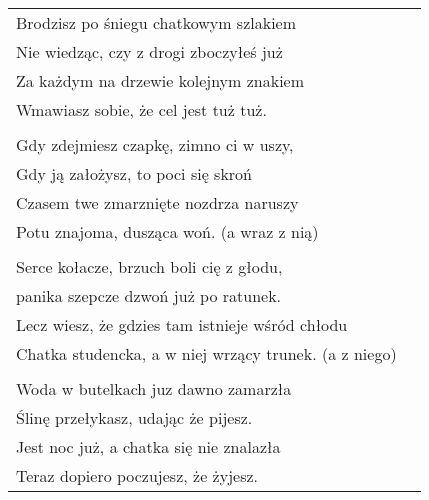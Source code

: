 \documentclass[a5paper]{article}
\begin{document}
\noindent
\begin{tabular}{@{}p{9.50cm}p{3cm}@{}}
Brodzisz po śniegu chatkowym szlakiem \\
Nie wiedząc, czy z drogi zboczyłeś już\\
Za każdym na drzewie kolejnym znakiem\\
Wmawiasz sobie, że cel jest tuż tuż.\\ \\

Gdy zdejmiesz czapkę, zimno ci w uszy,\\
Gdy ją założysz, to poci się skroń\\
Czasem twe zmarznięte nozdrza naruszy\\
Potu znajoma, dusząca woń. (a wraz z nią)\\\\

Serce kołacze, brzuch boli cię z głodu,\\
panika szepcze dzwoń już po ratunek.\\
Lecz wiesz, że gdzies tam istnieje wśród chłodu\\
Chatka studencka, a w niej wrzący trunek. (a z niego)\\\\

Woda w butelkach juz dawno zamarzła\\
Ślinę przełykasz, udając że pijesz.\\
Jest noc już, a chatka się nie znalazła\\
Teraz dopiero poczujesz, że żyjesz.
\end{tabular}
\end{document}
